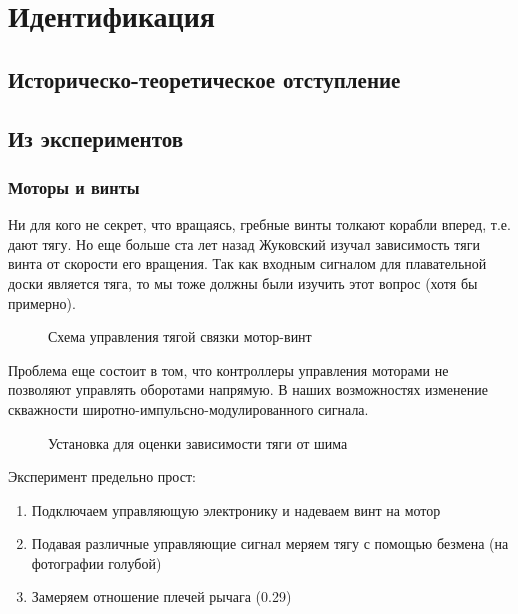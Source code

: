 \documentclass[a4paper]{article}
\begin{document}
\section{Идентификация}

\subsection{Историческо-теоретическое отступление}


\subsection{Из экспериментов}


\subsubsection{Моторы и винты}

Ни для кого не секрет, что вращаясь, гребные винты толкают корабли вперед, т.е. дают тягу. Но еще больше ста лет назад Жуковский изучал зависимость тяги винта от скорости его вращения. Так как входным сигналом для плавательной доски является тяга, то мы тоже должны были изучить этот вопрос (хотя бы примерно). 

\begin{figure}[h]
	\caption{Схема управления тягой связки мотор-винт}
\end{figure}

Проблема еще состоит в том, что контроллеры управления моторами не позволяют управлять оборотами напрямую. В наших возможностях изменение скважности широтно-импульсно-модулированного сигнала. 

\begin{figure}[h]
	\caption{Установка для оценки зависимости тяги от шима}
\end{figure}

Эксперимент предельно прост:

\begin{enumerate}
	\item Подключаем управляющую электронику и надеваем винт на мотор
	\item Подавая различные управляющие сигнал меряем тягу с помощью безмена (на фотографии голубой)
	\item Замеряем отношение плечей рычага (0.29)
\end{enumerate}
\end{document}
